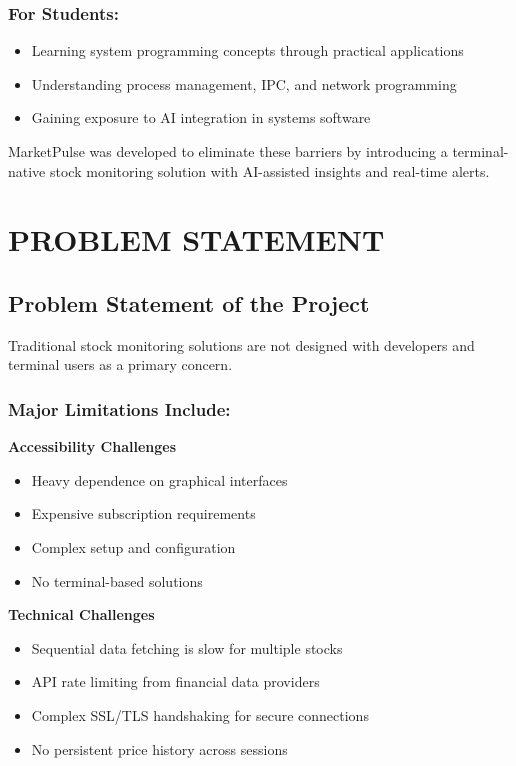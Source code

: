 \documentclass[12pt,a4paper]{article}
\begin{document}
\subsubsection{For Students:}
\begin{itemize}[itemsep=0.3em]
    \item Learning system programming concepts through practical applications
    \item Understanding process management, IPC, and network programming
    \item Gaining exposure to AI integration in systems software
\end{itemize}

MarketPulse was developed to eliminate these barriers by introducing a terminal-native stock monitoring solution with AI-assisted insights and real-time alerts.

\newpage

\section{PROBLEM STATEMENT}

\subsection{Problem Statement of the Project}

Traditional stock monitoring solutions are not designed with developers and terminal users as a primary concern.

\subsubsection{Major Limitations Include:}

\textbf{Accessibility Challenges}
\begin{itemize}[itemsep=0.3em]
    \item Heavy dependence on graphical interfaces
    \item Expensive subscription requirements
    \item Complex setup and configuration
    \item No terminal-based solutions
\end{itemize}

\textbf{Technical Challenges}
\begin{itemize}[itemsep=0.3em]
    \item Sequential data fetching is slow for multiple stocks
    \item API rate limiting from financial data providers
    \item Complex SSL/TLS handshaking for secure connections
    \item No persistent price history across sessions
\end{itemize}
\end{document}
